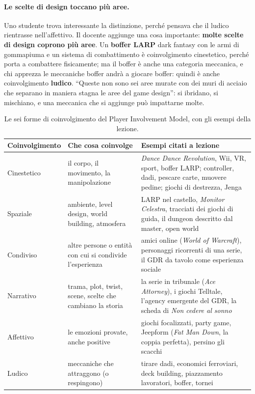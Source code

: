 \paragraph{Le scelte di design toccano più aree.} Uno studente trova interessante
la distinzione, perché pensava che il ludico rientrasse nell'affettivo. Il
docente aggiunge una cosa importante: \textbf{molte scelte di design coprono più
aree}. Un \textbf{boffer LARP} dark fantasy con le armi di gommapiuma e un
sistema di combattimento è coinvolgimento cinestetico, perché porta a combattere
fisicamente; ma il boffer è anche una categoria meccanica, e chi apprezza le
meccaniche boffer andrà a giocare boffer: quindi è anche coinvolgimento
\textbf{ludico}. ``Queste non sono sei aree murate con dei muri di acciaio che
separano in maniera stagna le aree del game design'': si ibridano, si mischiano,
e una meccanica che si aggiunge può impattarne molte.

\begin{table}[htbp]
\centering
\small
\begin{tabular}{@{}p{2.6cm}p{4.4cm}p{6.1cm}@{}}
\toprule
\textbf{Coinvolgimento} & \textbf{Che cosa coinvolge} & \textbf{Esempi citati a
lezione} \\
\midrule
Cinestetico & il corpo, il movimento, la manipolazione & \emph{Dance Dance
Revolution}, Wii, VR, sport, boffer LARP; controller, dadi, pescare carte,
muovere pedine; giochi di destrezza, Jenga \\
Spaziale & ambiente, level design, world building, atmosfera & LARP nel castello,
\emph{Monitor Celestra}, tracciati dei giochi di guida, il dungeon descritto dal
master, open world \\
Condiviso & altre persone o entità con cui si condivide l'esperienza & amici
online (\emph{World of Warcraft}), personaggi ricorrenti di una serie, il GDR da
tavolo come esperienza sociale \\
Narrativo & trama, plot, twist, scene, scelte che cambiano la storia & la serie
in tribunale (\emph{Ace Attorney}), i giochi Telltale, l'agency emergente del
GDR, la scheda di \emph{Non cedere al sonno} \\
Affettivo & le emozioni provate, anche positive & giochi focalizzati, party
game, Jeepform (\emph{Fat Man Down}, la coppia perfetta), persino gli scacchi \\
Ludico & meccaniche che attraggono (o respingono) & tirare dadi, economici
ferroviari, deck building, piazzamento lavoratori, boffer, tornei \\
\bottomrule
\end{tabular}
\caption{Le sei forme di coinvolgimento del Player Involvement Model, con gli
esempi della lezione.}
\label{a3:tab:pim}
\end{table}

